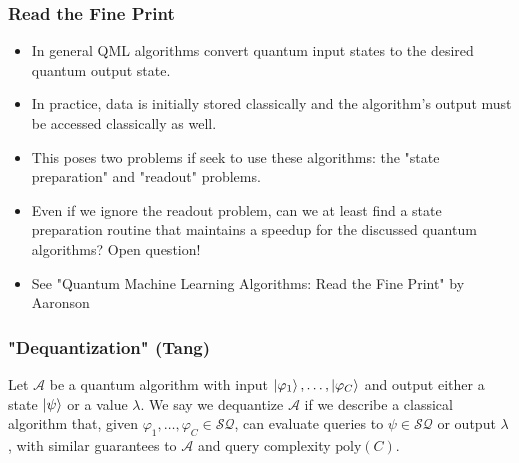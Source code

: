 \documentclass{beamer}
\newcommand\0{\mathbf{0}}
\newcommand\<{\langle}
\renewcommand\>{\rangle}
\renewcommand\phi{\varphi}
\begin{document}
\begin{frame}
\frametitle{Read the Fine Print}	
\begin{itemize}
\item In general QML algorithms convert quantum input states to the desired quantum output state. 
\item In practice, data is initially stored classically and the algorithm's output must be accessed classically as well.
\item This poses two problems if seek to use these algorithms: the "state preparation" and "readout" problems.
\item Even if we ignore the readout problem, can we at least find a state preparation routine that maintains a speedup for the discussed quantum algorithms? Open question!
\item See "Quantum Machine Learning Algorithms: Read the Fine Print" by Aaronson
\end{itemize}
\end{frame}

\begin{frame}
\frametitle{"Dequantization" (Tang)}
\begin{definition}
 Let $\mathcal{A}$ be a quantum algorithm with input $\ket{\phi_1},\ldots,\ket{\phi_C}$ and output either a state $\ket{\psi}$ or a value $\lambda$. We say we dequantize $\mathcal{A}$ if we describe a classical algorithm that, given $\phi_1,\ldots,\phi_C \in \mathcal{SQ}$, can evaluate queries to $\psi \in \mathcal{SQ}$ or output $\lambda$, with similar guarantees to $\mathcal{A}$ and query complexity $\text{poly}(C)$.	
\end{definition}
\end{frame}

 
\end{document}
